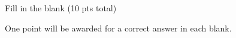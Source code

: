 \documentclass[10pt,draft]{article}
\begin{document}

\newpage

\noindent \begin{Large}Fill in the blank (10 pts total) \end{Large}

\bigskip

One point will be awarded for a correct answer in each blank. 

\bigskip
\end{document}

